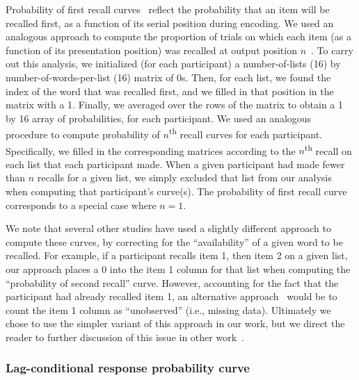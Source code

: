 \documentclass[11pt]{article}
\begin{document}
Probability of first recall curves~\citep{AtkiShif68, PostPhil65, WelcBurn24}
reflect the probability that an item will be recalled first, as a function of
its serial position during encoding. We used an analogous approach to compute
the proportion of trials on which each item (as a function of its presentation
position) was recalled at output position $n$~\citep{Hoga75, HowaKaha99,
PolyEtal09, ZhanEtal23}. To carry out this analysis, we initialized (for each
participant) a number-of-lists (16) by number-of-words-per-list (16) matrix of
0s. Then, for each list, we found the index of the word that was recalled
first, and we filled in that position in the matrix with a 1. Finally, we
averaged over the rows of the matrix to obtain a 1 by 16 array of
probabilities, for each participant. We used an analogous procedure to compute
probability of $n$\textsuperscript{th} recall curves for each participant.
Specifically, we filled in the corresponding matrices according to the
$n$\textsuperscript{th} recall on each list that each participant made. When a
given participant had made fewer than $n$ recalls for a given list, we simply
excluded that list from our analysis when computing that participant's
curve(s). The probability of first recall curve corresponds to a special case
where $n = 1$.

We note that several other studies have used a slightly different approach to
compute these curves, by correcting for the ``availability'' of a given word to
be recalled. For example, if a participant recalls item 1, then item 2 on a
given list, our approach places a 0 into the item 1 column for that list when
computing the ``probability of second recall'' curve. However, accounting for
the fact that the participant had already recalled item 1, an alternative
approach~\citep[e.g.,][]{Farr10} would be to count the item 1 column as
``unobserved'' (i.e., missing data). Ultimately we chose to use the simpler
variant of this approach in our work, but we direct the reader to further
discussion of this issue in other work~\citep{MoraGosh14, Farr14}.

\subsubsection*{Lag-conditional response probability curve}
\end{document}
